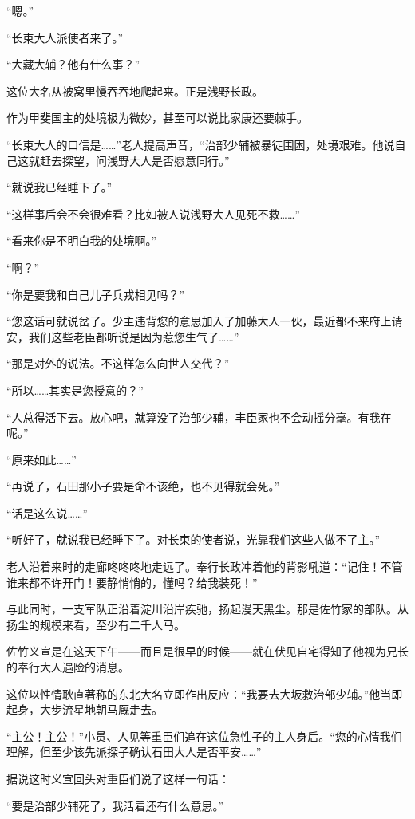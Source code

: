 \documentclass[
]{book}
\begin{document}
``嗯。''

``长束大人派使者来了。''

``大藏大辅？他有什么事？''

这位大名从被窝里慢吞吞地爬起来。正是浅野长政。

作为甲斐国主的处境极为微妙，甚至可以说比家康还要棘手。

``长束大人的口信是\ldots\ldots{}''老人提高声音，``治部少辅被暴徒围困，处境艰难。他说自己这就赶去探望，问浅野大人是否愿意同行。''

``就说我已经睡下了。''

``这样事后会不会很难看？比如被人说浅野大人见死不救\ldots\ldots{}''

``看来你是不明白我的处境啊。''

``啊？''

``你是要我和自己儿子兵戎相见吗？''

``您这话可就说岔了。少主违背您的意思加入了加藤大人一伙，最近都不来府上请安，我们这些老臣都听说是因为惹您生气了\ldots\ldots{}''

``那是对外的说法。不这样怎么向世人交代？''

``所以\ldots\ldots 其实是您授意的？''

``人总得活下去。放心吧，就算没了治部少辅，丰臣家也不会动摇分毫。有我在呢。''

``原来如此\ldots\ldots{}''

``再说了，石田那小子要是命不该绝，也不见得就会死。''

``话是这么说\ldots\ldots{}''

``听好了，就说我已经睡下了。对长束的使者说，光靠我们这些人做不了主。''

老人沿着来时的走廊咚咚咚地走远了。奉行长政冲着他的背影吼道：``记住！不管谁来都不许开门！要静悄悄的，懂吗？给我装死！''

与此同时，一支军队正沿着淀川沿岸疾驰，扬起漫天黑尘。那是佐竹家的部队。从扬尘的规模来看，至少有二千人马。

佐竹义宣是在这天下午------而且是很早的时候------就在伏见自宅得知了他视为兄长的奉行大人遇险的消息。

这位以性情耿直著称的东北大名立即作出反应：``我要去大坂救治部少辅。''他当即起身，大步流星地朝马厩走去。

``主公！主公！''小贯、人见等重臣们追在这位急性子的主人身后。``您的心情我们理解，但至少该先派探子确认石田大人是否平安\ldots\ldots{}''

据说这时义宣回头对重臣们说了这样一句话：

``要是治部少辅死了，我活着还有什么意思。''
\end{document}
